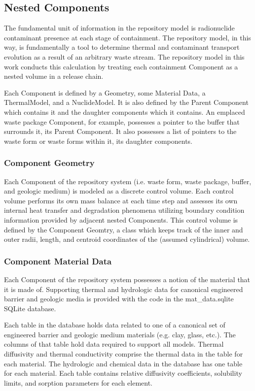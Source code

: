 \subsection{Nested Components}

The fundamental unit of information in the repository model is radionuclide 
contaminant presence at each stage of containment.  The repository model, in 
this way, is fundamentally a tool to determine thermal and contaminant 
transport evolution as a result of an arbitrary waste stream. The repository 
model in this work conducts this calculation by  treating each containment 
Component as a nested volume in a release chain. 

Each Component is defined by a Geometry, some Material Data, a ThermalModel, 
and a NuclideModel. It is also defined by the Parent Component which contains 
it and the daughter components which it contains. An emplaced waste package 
Component, for example, possesses a pointer to the buffer that surrounds it, 
its Parent Component. It also possesses a list of pointers to the waste form or 
waste forms within it, its daughter components. 

\subsubsection{Component Geometry}

Each Component of the repository system (i.e. waste form, waste package, buffer, 
and geologic medium) is modeled as a discrete control volume. Each control 
volume performs its own mass balance at each time step and assesses its own 
internal  heat transfer and degradation phenomena utilizing boundary condition 
information provided by adjacent nested Components. This control volume is 
defined by the Component Geomtry, a class which keeps track of the inner and 
outer radii, length, and centroid coordinates of the (assumed cylindrical) 
volume.

\subsubsection{Component Material Data}

Each Component of the repository system possesses a notion of the material that 
it is made of. Supporting thermal and hydrologic data for canonical engineered 
barrier and geologic media is provided with the code in the 
mat\_data.sqlite SQLite database.

Each table in the database holds data related to one of a canonical set of 
engineered barrier and geologic medium materials (e.g. clay, glass, etc.).  
The columns of that table hold data required to support all \Cyder models. 
Thermal diffusivity and thermal conductivity comprise the thermal data in the 
table for each material. The hydrologic and chemical data in the database has 
one table for each material. Each table contains relative diffusivity 
coefficients, solubility limits, and sorption parameters for each element.  

